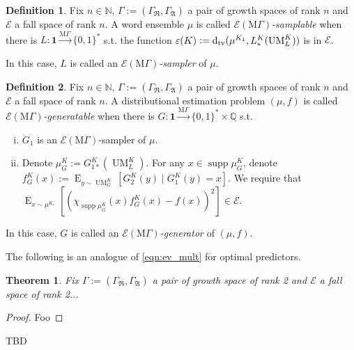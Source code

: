 \documentclass{article}
\numberwithin{equation}{section}
\theoremstyle{definition}
\newtheorem{definition}{Definition}[section]
\theoremstyle{plain}
\newtheorem{theorem}{Theorem}[section]
\newcommand{\Words}{{\{ 0, 1 \}^*}}
\DeclareMathOperator{\Supp}{supp}
\DeclareMathOperator{\E}{E}
\DeclareMathOperator{\UM}{UM}
\newcommand{\Dtv}{\operatorname{d}_{\textnormal{tv}}}
\newcommand{\Nats}{\mathbb{N}}
\newcommand{\Rats}{\mathbb{Q}}
\newcommand{\Grow}{\Gamma:=(\Gamma_{\mathfrak{R}},\Gamma_{\mathfrak{A}})}
\newcommand{\MGrow}{\mathrm{M}\Gamma}
\newcommand{\Fall}{\mathcal{E}}
\begin{document}
\begin{definition}

Fix $n \in \Nats$, $\Grow$ a pair of growth spaces of rank $n$ and $\Fall$ a fall space of rank $n$. A word ensemble $\mu$ is called \emph{$\Fall(\MGrow)$-samplable} when there is $L: \bm{1} \xrightarrow{\MGrow} \Words$ s.t. the function $\varepsilon(K):=\Dtv(\mu^{K_1},L_*^K(\UM_L^K))$ is in $\Fall$.

In this case, $L$ is called an \emph{$\Fall(\MGrow)$-sampler} of $\mu$.

\end{definition}

\begin{definition}

Fix $n \in \Nats$, $\Grow$ a pair of growth spaces of rank $n$ and $\Fall$ a fall space of rank $n$. A distributional estimation problem $(\mu,f)$ is called \emph{$\Fall(\MGrow)$-generatable} when there is $G: \bm{1} \xrightarrow{\MGrow} \Words \times \Rats$ s.t. 

\begin{enumerate}[(i)]

\item $G_1$ is an $\Fall(\MGrow)$-sampler of $\mu$.

\item Denote $\mu_G^K:=G_{1*}^K(\UM_L^K)$. For any $x \in \Supp \mu_G^K$, denote ${f_G^K(x):=\E_{y \sim\UM_G^K}[G_2^K(y) \mid G_1^K(y) = x]}$. We require that $\E_{x \sim \mu^{K_1}}[(\chi_{\Supp \mu_G^K}(x) f_G^K(x)-f(x))^2] \in \Fall$.

\end{enumerate}

In this case, $G$ is called an \emph{$\Fall(\MGrow)$-generator} of $(\mu,f)$.

\end{definition}

The following is an analogue of \ref{eqn:ev_mult} for optimal predictors.

\begin{theorem}

Fix $\Grow$ a pair of growth space of rank 2 and $\Fall$ a fall space of rank 2...

\end{theorem}

\begin{proof}

Foo

\end{proof}

TBD
\end{document}
